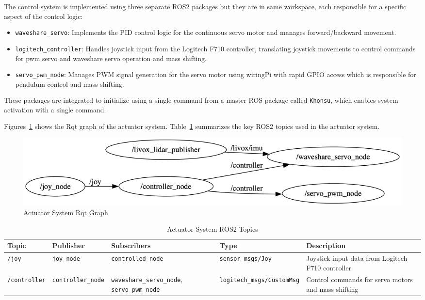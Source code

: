 \documentclass[english, bachelor, utf8]{base/thesis_telematics}
\begin{document}
The control system is implemented using three separate ROS2 packages but they are in same workspace, each responsible for a specific aspect of the control logic:
\begin{itemize}
    \item \texttt{waveshare\_servo}: Implements the PID control logic for the continuous servo motor and manages forward/backward movement.
    \item \texttt{logitech\_controller}: Handles joystick input from the Logitech F710 controller, translating joystick movements to control commands for pwm servo and waveshare servo operation and mass shifting.
    \item \texttt{servo\_pwm\_node}: Manages PWM signal generation for the servo motor using wiringPi with rapid GPIO access which is responsible for pendulum control and mass shifting.
\end{itemize} 
These packages are integrated to initialize using a single command from a master ROS package called \texttt{Khonsu}, which enables system activation with a single command.

Figures~\ref{fig:ros_actuator} shows the Rqt graph of the actuator system.
Table~\ref{tab:actuator_topics} summarizes the key ROS2 topics used in the actuator system.
\begin{figure}[H]
    \centering
    \includegraphics[width=\textwidth]{pics/rqt/ros_actuator.png}
    \caption{Actuator System Rqt Graph}
    \label{fig:ros_actuator}
\end{figure}

\begin{table}[H]
\centering
\caption{Actuator System ROS2 Topics}
\label{tab:actuator_topics}
\scriptsize
\begin{tabularx}{\textwidth}{@{}llXlX@{}}
\toprule
\textbf{Topic} & \textbf{Publisher} & \textbf{Subscribers} & \textbf{Type} & \textbf{Description} \\
\midrule
\texttt{/joy} & \texttt{joy\_node} & \texttt{controlled\_node} & \texttt{sensor\_msgs/Joy} & Joystick input data from Logitech F710 controller \\[0.3em]
\texttt{/controller} & \texttt{controller\_node} & \texttt{waveshare\_servo\_node}, \texttt{servo\_pwm\_node} & \texttt{logitech\_msgs/CustomMsg} & Control commands for servo motors and mass shifting \\
\bottomrule
\end{tabularx}
\end{table}
\end{document}
